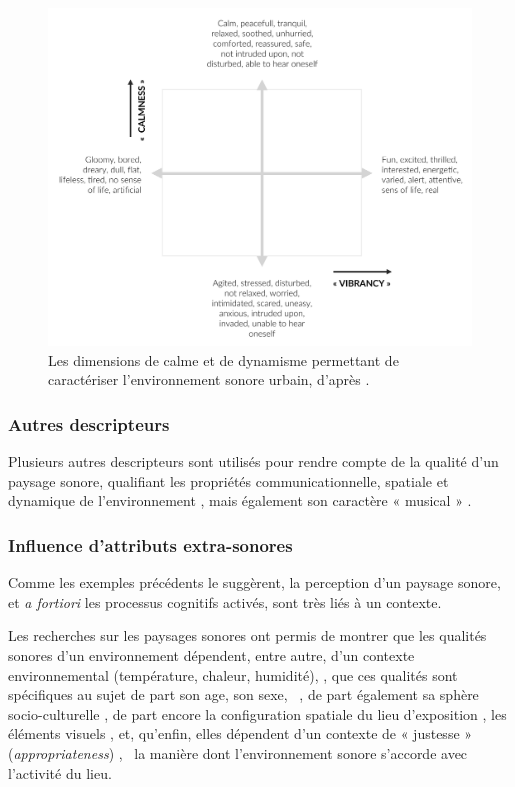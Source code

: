 \begin{figure}[t]
        \myfloatalign
        \includegraphics[width=.8\linewidth]{gfx/ch_3/calmVibran}
        \caption[Les dimensions de calme et de dynamisme permettant de caractériser l'environnement sonore urbain.]{Les dimensions de calme et de dynamisme permettant de caractériser l'environnement sonore urbain, d'après \citep{cain2013development}.}\label{fig:calmVibran}
\end{figure}

\subsubsection{Autres descripteurs}

Plusieurs autres descripteurs sont utilisés pour rendre compte de la qualité d'un paysage sonore, qualifiant les propriétés communicationnelle, spatiale et dynamique de l'environnement \citep{kang2010semantic}, mais également son caractère « musical » \citep{botteldooren2006temporal}.

\subsubsection{Influence d'attributs extra-sonores}
\label{sec:ch3_contexteDimension}

Comme les exemples précédents le suggèrent, la perception d'un paysage sonore, et \emph{a fortiori} les processus cognitifs activés, sont très liés à un contexte.

Les recherches sur les paysages sonores ont permis de montrer que les qualités sonores d'un environnement dépendent, entre autre, d'un contexte environnemental (température, chaleur, humidité), \citep{meng2013field,jeon2011non}, que ces qualités sont spécifiques au sujet de part son age, son sexe, \etc~, de part également sa sphère socio-culturelle \citep{hall2013exploratory,yu2010factors,guillen2007importance}, de part encore la configuration spatiale du lieu d'exposition \citep{hall2013exploratory}, les éléments visuels \citep{de2006quiet,guillen2007importance}, et, qu'enfin, elles dépendent d'un contexte de « justesse » (\emph{appropriateness}) \citep{nielbo2013investigating,de2006quiet}, \ie~la manière dont l'environnement sonore s'accorde avec l'activité du lieu.
 
